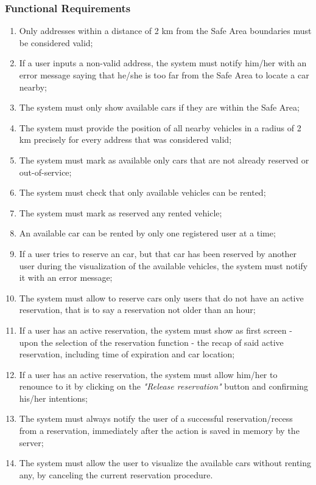 \subsubsection{Functional Requirements}
\begin{enumerate}
\item Only addresses within a distance of 2 km from the Safe Area boundaries must be considered valid;
\item If a user inputs a non-valid address, the system must notify him/her with an error message saying that he/she is too far from the Safe Area to locate a car nearby;
\item The system must only show available cars if they are within the Safe Area;
\item The system must provide the position of all nearby vehicles in a radius of 2 km precisely for every address that was considered valid;
\item The system must mark as available only cars that are not already reserved or out-of-service;
\item The system must check that only available vehicles can be rented;
\item The system must mark as reserved any rented vehicle;
\item An available car can be rented by only one registered user at a time;
\item If a user tries to reserve an car, but that car has been reserved by another user during the visualization of the available vehicles, the system must notify it with an error message;
\item The system must allow to reserve cars only users that do not have an active reservation, that is to say a reservation not older than an hour;
\item If a user has an active reservation, the system must show as first screen - upon the selection of the reservation function - the recap of said active reservation, including time of expiration and car location;
\item If a user has an active reservation, the system must allow him/her to renounce to it by clicking on the \emph{"Release reservation"} button and confirming his/her intentions;
\item The system must always notify the user of a successful reservation/recess from a reservation, immediately after the action is saved in memory by the server;
\item The system must allow the user to visualize the available cars without renting any, by canceling the current reservation procedure.
\end{enumerate}

